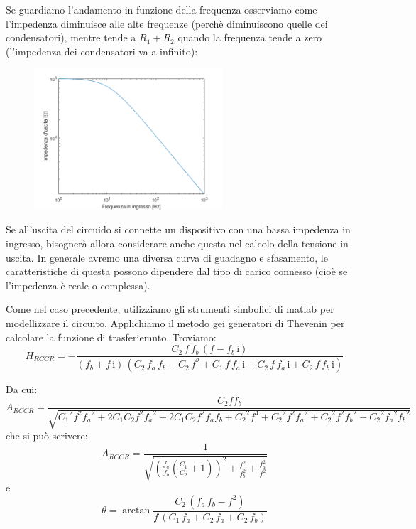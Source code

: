 Se guardiamo l'andamento in funzione della frequenza osserviamo come l'impedenza diminuisce alle alte frequenze (perchè diminuiscono quelle dei condensatori), mentre tende a $R_1 + R_2$ quando la frequenza tende a zero (l'impedenza dei condensatori va a infinito):
\begin{figure}[H]
\caption{}
    \includegraphics[width=7cm]{settimana_2/immagini/CRRCRth.png}
    \centering
\end{figure}

Se all'uscita del circuido si connette un dispositivo con una bassa impedenza in ingresso, bisognerà allora considerare anche questa nel calcolo della tensione in uscita. In generale avremo una diversa curva di guadagno e sfasamento, le caratteristiche di questa possono dipendere dal tipo di carico connesso (cioè se l'impedenza è reale o complessa).

Come nel caso precedente, utilizziamo gli strumenti simbolici di matlab per modellizzare il circuito. Applichiamo il metodo gei generatori di Thevenin per calcolare la funzione di trasferiemnto. Troviamo:
\begin{equation}
    H_{RCCR} = -\frac{C_2 \,f\,f_b \,{\left(f-f_b \,\mathrm{i}\right)}}{{\left(f_b +f\,\mathrm{i}\right)}\,{\left(C_2 \,f_a \,f_b -C_2 \,f^2 +C_1 \,f\,f_a \,\mathrm{i}+C_2 \,f\,f_a \,\mathrm{i}+C_2 \,f\,f_b \,\mathrm{i}\right)}}
\end{equation}

Da cui:
\begin{equation}
    A_{RCCR} = \frac{C_2 ff_b }{\sqrt{{C_1 }^2 f^2 {f_a }^2 +2C_1 C_2 f^2 {f_a }^2 +2C_1 C_2 f^2 f_a f_b +{C_2 }^2 f^4 +{C_2 }^2 f^2 {f_a }^2 +{C_2 }^2 f^2 {f_b }^2 +{C_2 }^2 {f_a }^2 {f_b }^2 }}
\end{equation}
che si può scrivere:
\begin{equation}
    A_{RCCR} = \frac{1}{\sqrt{ (\frac{f_a}{f_b} (\frac{C_1}{C_2} + 1))^2 + \frac{f^2}{f_b^2} + \frac{f_a^2}{f^2}}}
\end{equation}
e
\begin{equation}
    \theta = \arctan{\frac{C_2 \,{\left(f_a \,f_b -f^2 \right)}}{f\,{\left(C_1 \,f_a +C_2 \,f_a +C_2 \,f_b \right)}}}
\end{equation}

